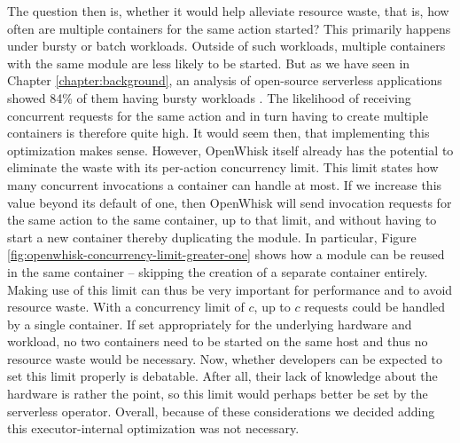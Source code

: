 The question then is, whether it would help alleviate resource waste, that is, how often are multiple containers for the same action started?
This primarily happens under bursty or batch workloads. Outside of such workloads, multiple containers with the same module are less likely to be started. But as we have seen in Chapter \ref{chapter:background}, an analysis of open-source serverless applications showed 84\% of them having bursty workloads \cite{Eismann2021}. The likelihood of receiving concurrent requests for the same action and in turn having to create multiple containers is therefore quite high. It would seem then, that implementing this optimization makes sense.
However, OpenWhisk itself already has the potential to eliminate the waste with its per-action concurrency limit. This limit states how many concurrent invocations a container can handle at most. If we increase this value beyond its default of one, then OpenWhisk will send invocation requests for the same action to the same container, up to that limit, and without having to start a new container thereby duplicating the module. In particular, Figure \ref{fig:openwhisk-concurrency-limit-greater-one} shows how a module can be reused in the same container -- skipping the creation of a separate container entirely. Making use of this limit can thus be very important for performance and to avoid resource waste. With a concurrency limit of $c$, up to $c$ requests could be handled by a single container. If set appropriately for the underlying hardware and workload, no two containers need to be started on the same host and thus no resource waste would be necessary. Now, whether developers can be expected to set this limit properly is debatable. After all, their lack of knowledge about the hardware is rather the point, so this limit would perhaps better be set by the serverless operator.
Overall, because of these considerations we decided adding this executor-internal optimization was not necessary.
